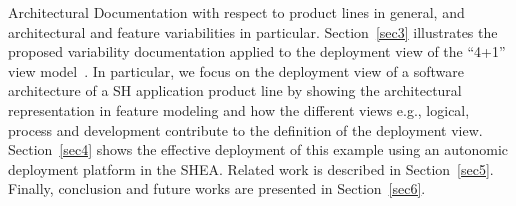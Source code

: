 \documentclass{llncs}
\begin{document}
Architectural Documentation with respect to product lines in general, and
architectural and feature variabilities in particular. Section~\ref{sec3} illustrates the proposed variability documentation applied to the deployment view of the ``4+1'' view model~\cite{kruchten1995}. In particular, we focus on the deployment view of a software architecture of a SH application product line by showing the architectural representation in feature modeling and how the different views e.g., logical, process and development contribute to the definition of the deployment view.
Section~\ref{sec4} shows the effective deployment of this example using an autonomic deployment platform in the SHEA. Related work is described in Section~\ref{sec5}. Finally, conclusion and future works are presented in Section~\ref{sec6}.
\end{document}
